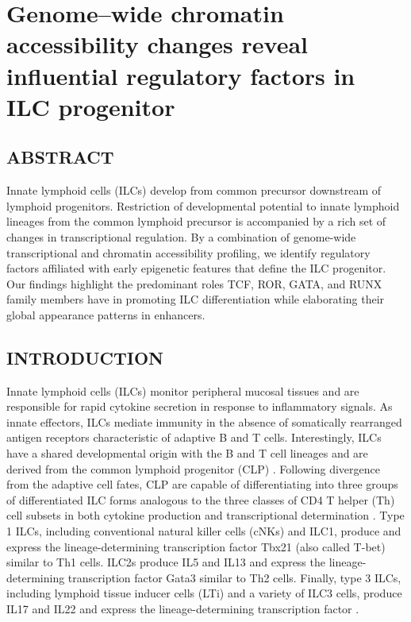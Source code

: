 


\chapter[Genome--wide chromatin accessibility changes reveal \\ influential regulatory factors in ILC progenitor]{Genome--wide chromatin accessibility changes reveal influential regulatory factors in ILC progenitor}

\section{ABSTRACT}

Innate lymphoid cells (ILCs) develop from common precursor downstream of lymphoid progenitors. Restriction of developmental potential to innate lymphoid lineages from the common lymphoid precursor is accompanied by a rich set of changes in transcriptional regulation. By a combination of genome-wide transcriptional and chromatin accessibility profiling, we identify regulatory factors affiliated with early epigenetic features that define the ILC progenitor. Our findings highlight the predominant roles TCF, ROR, GATA, and RUNX family members have in promoting ILC differentiation while elaborating their global appearance patterns in enhancers. 

\section{INTRODUCTION}

Innate lymphoid cells (ILCs) monitor peripheral mucosal tissues and are responsible for rapid cytokine secretion in response to inflammatory signals. As innate effectors, ILCs mediate immunity in the absence of somatically rearranged antigen receptors characteristic of adaptive B and T cells. Interestingly, ILCs have a shared developmental origin with the B and T cell lineages and are derived from the common lymphoid progenitor (CLP) \cite{yang2011,mebius2001}. Following divergence from the adaptive cell fates, CLP are capable of differentiating into three groups of differentiated ILC forms analogous to the three classes of CD4\UP{} T helper (Th) cell subsets in both cytokine production and transcriptional determination \cite{artis2015}. Type 1 ILCs, including conventional natural killer cells (cNKs) and ILC1, produce \IFNg and express the lineage-determining transcription factor Tbx21 (also called T-bet) similar to Th1 cells. ILC2s produce IL5 and IL13 and express the lineage-determining transcription factor Gata3 similar to Th2 cells. Finally, type 3 ILCs, including lymphoid tissue inducer cells (LTi) and a variety of ILC3 cells, produce IL17 and IL22 and express the lineage-determining transcription factor \RORgt. 


